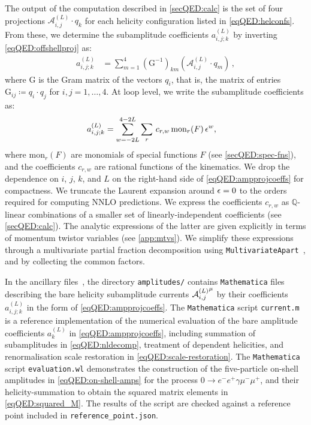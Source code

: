 \documentclass[main.tex]{subfiles}
\begin{document}
The output of the computation described in \cref{secQED:calc} is the set of four projections $\mathcal{A}^{(L)}_{i,j} \cdot q_k$ for each helicity configuration listed in \cref{eqQED:helconfs}.
From these, we determine the subamplitude coefficients $a_{i,j;k}^{(L)}$ by inverting \cref{eqQED:offshellproj} as:
\begin{align}
    \label{eqQED:ampcoeffinv}
    a_{i,j ; k}^{(L)} &= \sum_{m=1}^4 \left(\mathrm{G}^{-1}\right)_{km} \left(\mathcal{A}^{(L)}_{i,j} \cdot q_m\right) \,,
\end{align}
where $\mathrm{G}$ is the Gram matrix of the vectors $q_i$, that is, the matrix of entries $\mathrm{G}_{ij} \coloneqq q_i \cdot q_j$ for $i,j=1,\ldots,4$.
At loop level, we write the subamplitude coefficients as:
\begin{align}
    \label{eqQED:ampprojcoeffs}
    a_{i,j;k}^{(L)} &= \sum_{w=-2L}^{4-2L} \sum_r\,c_{r,w}\,\text{mon}_r(F)\,\epsilon^w ,
\end{align}
where $\text{mon}_r(F)$ are monomials of special functions $F$ (see \cref{secQED:spec-fns}), and the coefficients $c_{r,w}$ are rational functions of the kinematics. 
We drop the dependence on $i$, $j$, $k$, and $L$ on the right-hand side of \cref{eqQED:ampprojcoeffs} for compactness. 
We truncate the Laurent expansion around $\epsilon=0$ to the orders required for computing NNLO predictions.
We express the coefficients $c_{r,w}$ as $\mathbb{Q}$-linear combinations of a smaller set of linearly-independent coefficients (see \cref{secQED:calc}).
The analytic expressions of the latter are given explicitly in terms of momentum twistor variables (see \cref{app:mtvs}).
We simplify these expressions through a multivariate partial fraction decomposition using \texttt{MultivariateApart}~\cite{Heller:2021qkz}, and by collecting the common factors.

In the ancillary files~\cite{zenodo}, the directory \texttt{amplitudes/} contains \texttt{Mathematica} files describing the bare helicity subamplitude currents ${\mathcal{A}^{(L)}_{i, j}}^{\mu}$ by their coefficients $a_{i,j;k}^{(L)}$ in the form of \cref{eqQED:ampprojcoeffs}.
The \texttt{Mathematica} script \texttt{current.m} is a reference implementation of the numerical evaluation of the bare amplitude coefficients $a_k^{(L)}$ in \cref{eqQED:ampprojcoeffs}, including summation of subamplitudes in \cref{eqQED:nldecomp}, treatment of dependent helicities, and renormalisation scale restoration in \cref{eqQED:scale-restoration}.
The \texttt{Mathematica} script \texttt{evaluation.wl} demonstrates the construction of the five-particle on-shell amplitudes in \cref{eqQED:on-shell-amps} for the process $0\to e^- e^+ \gamma \mu^- \mu^+$, and their helicity-summation to obtain the squared matrix elements in \cref{eqQED:squared_M}.
The results of the script are checked against a reference point included in \texttt{reference\_point.json}.
\end{document}
